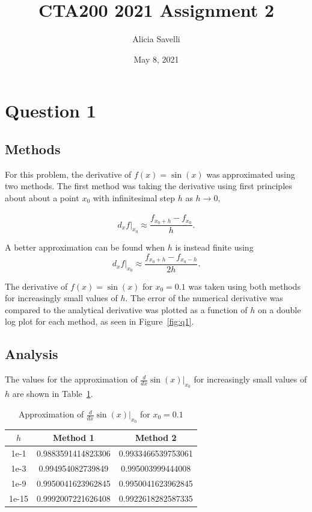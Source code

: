 \documentclass{article}
\title{CTA200 2021 Assignment 2}
\author{Alicia Savelli}
\date{May 8, 2021}
\begin{document}
\maketitle

\section{Question 1}

\subsection{Methods}
For this problem, the derivative of $f(x)=\sin(x)$ was approximated using two methods.  The first method was taking the derivative using first principles about about a point $x_0$ with infinitesimal step $h$ as $h \xrightarrow[]{} 0$,

\begin{equation}
    d_x f|_{x_0} \approx \frac{f_{x_0 + h} - f_{x_0}}{h}.
    \label{eq:m1}
\end{equation}

A better approximation can be found when $h$ is instead finite using
\begin{equation}
    d_x f|_{x_0} \approx \frac{f_{x_0 + h} - f_{x_0 - h}}{2h}.
    \label{eq:m2}
\end{equation}

The derivative of $f(x)=\sin(x)$ for $x_0 = 0.1$ was taken using both methods for increasingly small values of $h$.  The error of the numerical derivative was compared to the analytical derivative was plotted as a function of $h$ on a double log plot for each method, as seen in Figure~\ref{fig:q1}.  

\subsection{Analysis}
The values for the approximation of $\frac{d}{dx} \sin(x) |_{x_0}$ for increasingly small values of $h$ are shown in Table~\ref{tab:h}.

\begin{table}[h]
\caption{Approximation of $\frac{d}{dx} \sin(x) |_{x_0}$ for $x_0=0.1$}
\label{tab:h}
\vspace{0.15in}
\begin{center}
\begin{tabular}{|c|c|c|}
\hline
$h$ & Method 1 & Method 2 \\
\hline
1e-1 & 0.9883591414823306 & 0.9933466539753061 \\
1e-3 & 0.994954082739849 & 0.995003999444008 \\
1e-9 & 0.9950041623962845 & 0.9950041623962845 \\
1e-15 & 0.9992007221626408 & 0.9922618282587335 \\
\hline
\end{tabular}
\end{center}  
\end{table}
\end{document}
